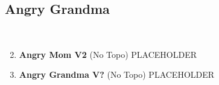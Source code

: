 \subsection*{Angry Grandma}\label{bf:Angry Grandma}
\

\begin{enumerate}[]
	\setcounter{enumi}{1}
	\item\label{rt:Angry Mom} \colorbox{green!20}{\textbf{Angry Mom V2  } }
	\newline (No Topo) 
	\newline PLACEHOLDER\
	\setcounter{enumi}{2}
	\item\label{rt:Angry Grandma} \colorbox{black!20}{\textbf{Angry Grandma V?  } }
	\newline (No Topo) 
	\newline PLACEHOLDER\
\end{enumerate}
\clearpage